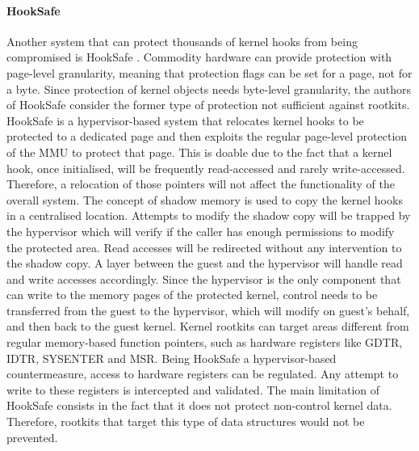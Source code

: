 \paragraph{HookSafe}
Another system that can protect thousands of kernel hooks from being compromised is HookSafe \cite{HookSafe}. Commodity hardware can provide protection with page-level granularity, meaning that protection flags can be set for a page, not for a byte. Since protection of kernel objects needs byte-level granularity, the authors of HookSafe consider the former type of protection not sufficient against rootkits.
HookSafe is a hypervisor-based system that relocates kernel hooks to be protected to a dedicated page and then exploits the regular page-level protection of the MMU to protect that page.
This is doable due to the fact that a kernel hook, once initialised, will be frequently read-accessed and rarely write-accessed. Therefore, a relocation of those pointers will not affect the functionality of the overall system.
The concept of shadow memory is used to copy the kernel hooks in a centralised location. Attempts to modify the shadow copy will be trapped by the hypervisor which will verify if the caller has enough permissions to modify the protected area. Read accesses will be redirected without any intervention to the shadow copy.
A layer between the guest and the hypervisor will handle read and write accesses accordingly. Since the hypervisor is the only component that can write to the memory pages of the protected kernel, control needs to be transferred from the guest to the hypervisor, which will modify on guest's behalf, and then back to the guest kernel.
Kernel rootkits can target areas different from regular memory-based function pointers, such as hardware registers like GDTR, IDTR, SYSENTER and MSR. Being HookSafe a hypervisor-based countermeasure, access to hardware registers can be regulated. Any attempt to write to these registers is intercepted and validated. 
The main limitation of HookSafe consists in the fact that it does not protect non-control kernel data. Therefore, rootkits that target this type of data structures would not be prevented.

